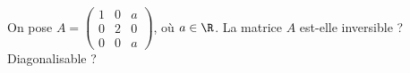 \begin{enonce}
\begin{exercise}[ID={RMS135 E1414},subtitle={IMT MP 2024},tags={},difficulty={}]
On pose $A = \begin{pmatrix}
1 & 0 &  a \\
0 & 2 &  0 \\
0 & 0 &  a
\end{pmatrix}$, où $a \in \R$. La matrice $A$ est-elle inversible ? Diagonalisable ?
\end{exercise}
\begin{solution}
\end{solution}
\end{enonce}
